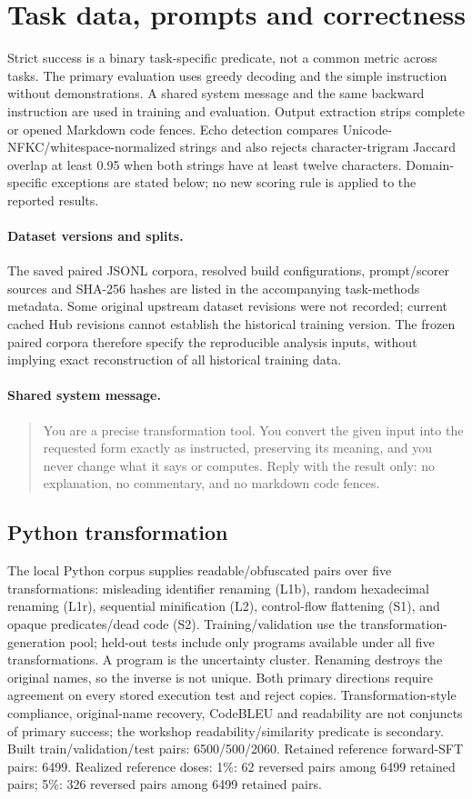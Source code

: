 \section{Task data, prompts and correctness}
\label{app:task-scoring}
Strict success is a binary task-specific predicate, not a common metric across tasks. The primary evaluation uses greedy decoding and the simple instruction without demonstrations. A shared system message and the same backward instruction are used in training and evaluation. Output extraction strips complete or opened Markdown code fences. Echo detection compares Unicode-NFKC/whitespace-normalized strings and also rejects character-trigram Jaccard overlap at least 0.95 when both strings have at least twelve characters. Domain-specific exceptions are stated below; no new scoring rule is applied to the reported results.
\paragraph{Dataset versions and splits.} The saved paired JSONL corpora, resolved build configurations, prompt/scorer sources and SHA-256 hashes are listed in the accompanying task-methods metadata. Some original upstream dataset revisions were not recorded; current cached Hub revisions cannot establish the historical training version. The frozen paired corpora therefore specify the reproducible analysis inputs, without implying exact reconstruction of all historical training data.
\paragraph{Shared system message.}
\begin{quote}\small
You are a precise transformation tool. You convert the given input into the requested form exactly as instructed, preserving its meaning, and you never change what it says or computes. Reply with the result only: no explanation, no commentary, and no markdown code fences.
\end{quote}
\subsection{Python transformation}
The local Python corpus supplies readable/obfuscated pairs over five transformations: misleading identifier renaming (L1b), random hexadecimal renaming (L1r), sequential minification (L2), control-flow flattening (S1), and opaque predicates/dead code (S2). Training/validation use the transformation-generation pool; held-out tests include only programs available under all five transformations. A program is the uncertainty cluster. Renaming destroys the original names, so the inverse is not unique. Both primary directions require agreement on every stored execution test and reject copies. Transformation-style compliance, original-name recovery, CodeBLEU and readability are not conjuncts of primary success; the workshop readability/similarity predicate is secondary.
Built train/validation/test pairs: 6500/500/2060. Retained reference forward-SFT pairs: 6499. 
Realized reference doses: 1\%: 62 reversed pairs among 6499 retained pairs; 5\%: 326 reversed pairs among 6499 retained pairs.

